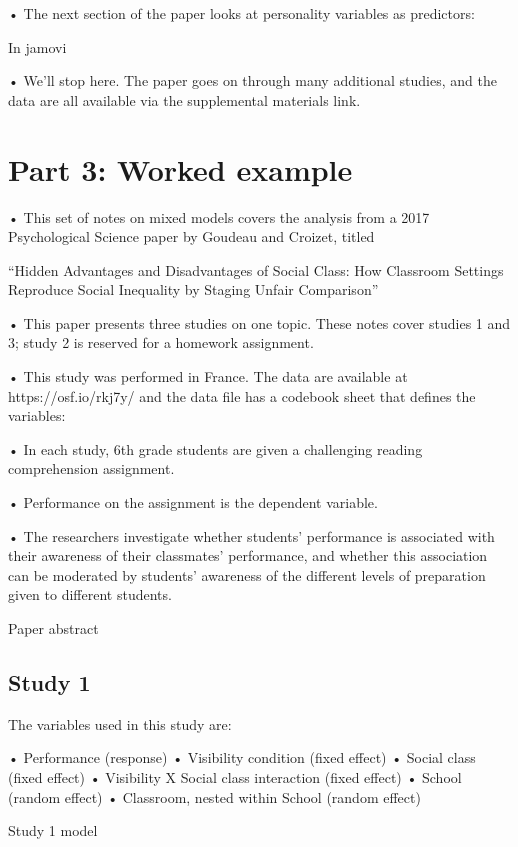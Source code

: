\documentclass[
  letterpaper,
  DIV=11,
  numbers=noendperiod]{scrreprt}
\begin{document}
• The next section of the paper looks at personality variables as
predictors:

In jamovi

• We'll stop here. The paper goes on through many additional studies,
and the data are all available via the supplemental materials link.

\hypertarget{part-3-worked-example}{%
\section{Part 3: Worked example}\label{part-3-worked-example}}

• This set of notes on mixed models covers the analysis from a 2017
Psychological Science paper by Goudeau and Croizet, titled

``Hidden Advantages and Disadvantages of Social Class: How Classroom
Settings Reproduce Social Inequality by Staging Unfair Comparison''

• This paper presents three studies on one topic. These notes cover
studies 1 and 3; study 2 is reserved for a homework assignment.

• This study was performed in France. The data are available at
https://osf.io/rkj7y/ and the data file has a codebook sheet that
defines the variables:

• In each study, 6th grade students are given a challenging reading
comprehension assignment.

• Performance on the assignment is the dependent variable.

• The researchers investigate whether students' performance is
associated with their awareness of their classmates' performance, and
whether this association can be moderated by students' awareness of the
different levels of preparation given to different students.

Paper abstract

\hypertarget{study-1}{%
\subsection{Study 1}\label{study-1}}

The variables used in this study are:

• Performance (response) • Visibility condition (fixed effect) • Social
class (fixed effect) • Visibility X Social class interaction (fixed
effect) • School (random effect) • Classroom, nested within School
(random effect)

Study 1 model
\end{document}
